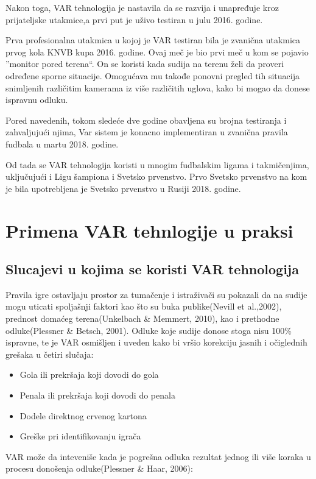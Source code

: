 \documentclass[a4paper]{article}
\begin{document}
Nakon toga, VAR tehnologija je nastavila da se razvija i unapređuje kroz prijateljske utakmice,a prvi put je uživo testiran u julu 2016. godine. 

Prva profesionalna utakmica u kojoj je VAR testiran bila je zvanična utakmica prvog kola KNVB kupa 2016. godine. Ovaj meč je bio prvi meč u kom se pojavio ”monitor pored terena“. On se koristi kada sudija na terenu želi da proveri određene sporne situacije. Omogućava mu takođe ponovni pregled tih situacija snimljenih različitim kamerama iz više različitih uglova, kako bi mogao da donese ispravnu odluku.

Pored navedenih, tokom sledeće dve godine obavljena su brojna testiranja i zahvaljujući njima, Var sistem je konacno implementiran u zvanična pravila fudbala u martu 2018. godine.

Od tada se VAR tehnologija koristi u mnogim fudbalskim ligama i takmičenjima, uključujući i Ligu šampiona i Svetsko prvenstvo. Prvo Svetsko prvenstvo na kom je bila upotrebljena je Svetsko prvenstvo u Rusiji 2018. godine.

\section{Primena VAR tehnlogije u praksi}
\subsection{Slucajevi u kojima se koristi VAR tehnologija}
Pravila igre ostavljaju prostor za tumačenje i istraživači su pokazali da na sudije mogu uticati spoljašnji faktori kao što su buka publike(Nevill et al.,2002), prednost domaćeg terena(Unkelbach \& Memmert, 2010), kao i prethodne odluke(Plessner \& Betsch, 2001). Odluke koje sudije donose stoga nisu 100\% ispravne, te je VAR osmišljen i uveden kako bi vršio korekciju jasnih i očiglednih grešaka u četiri slučaja:
\begin{itemize}
\item Gola ili prekršaja koji dovodi do gola
\item Penala ili prekršaja koji dovodi do penala
\item Dodele direktnog crvenog kartona
\item Greške pri identifikovanju igrača
\end{itemize}

VAR može da inteveniše kada je pogrešna odluka rezultat jednog ili više koraka u procesu donošenja odluke(Plessner \& Haar, 2006):
\end{document}
